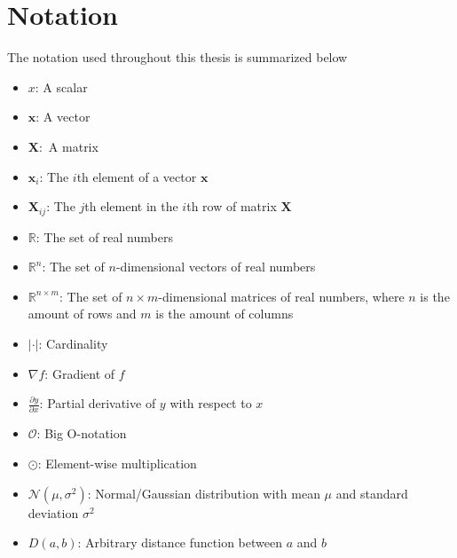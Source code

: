 \documentclass[./main.tex]{subfiles}
\begin{document}
\section{Notation}
The notation used throughout this thesis is summarized below

\begin{itemize}
    \item $x$: A scalar
    \item $\bm{x}$: A vector
    \item $\bm{X}:$ A matrix
    \item $\bm{x}_i$: The $i$th element of a vector $\bm{x}$ 
    \item $\bm{X}_{ij}$: The $j$th element in the $i$th row of matrix $\bm{X}$
    \item $\mathbb{R}$: The set of real numbers
    \item $\mathbb{R}^n$: The set of $n$-dimensional vectors of real numbers
    \item $\mathbb{R}^{n \times m}$: The set of $n \times m$-dimensional matrices of real numbers, where $n$ is the amount of rows and $m$ is the amount of columns
    \item $|\cdot|$: Cardinality
    \item $\nabla f$: Gradient of $f$
    \item $\frac{\partial y}{\partial x}$: Partial derivative of $y$ with respect to $x$
    \item $\mathcal{O}$: Big O-notation
    \item $\odot$: Element-wise multiplication
    \item $\mathcal{N} \left(\mu, \sigma^2 \right)$: Normal/Gaussian distribution with mean $\mu$ and standard deviation $\sigma^2$
    \item $D(a, b)$: Arbitrary distance function between $a$ and $b$
\end{itemize}
\end{document}
